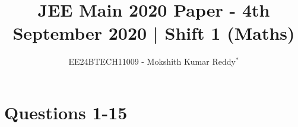 \documentclass[journal,12pt,twocolumn]{IEEEtran}
\theoremstyle{remark}
\begin{document}

\vspace{3cm}

\title{JEE Main 2020 Paper - 4th September 2020 | Shift 1 (Maths)}
\author{EE24BTECH11009 - Mokshith Kumar Reddy$^{*}$%
}
\maketitle
\newpage
\bigskip

\author{}
\date{}
\maketitle

\section*{Questions 1-15}
\end{document}
